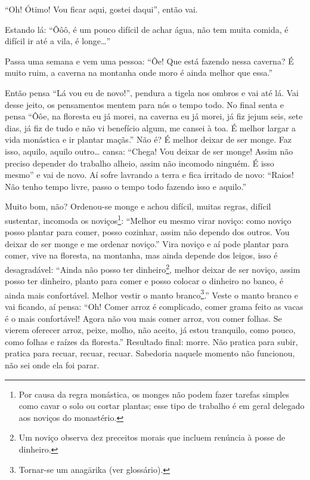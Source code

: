 “Oh! Ótimo! Vou ficar aqui, gostei daqui”, então vai. 

Estando lá: “Ôôô, é um pouco difícil de achar água, não tem muita
comida, é difícil ir até a vila, é longe…”

Passa uma semana e vem uma pessoa: “Ôe! Que está fazendo nessa
caverna? É muito ruim, a caverna na montanha onde moro é ainda melhor
que essa.”

Então pensa “Lá vou eu de novo!”, pendura a tigela nos ombros e vai
até lá. Vai desse jeito, os pensamentos mentem para nós o tempo todo.
No final senta e pensa “Ôôe, na floresta eu já morei, na caverna eu já
morei, já fiz jejum seis, sete dias, já fiz de tudo e não vi benefício
algum, me cansei à toa. É melhor largar a vida monástica e ir plantar
maçãs.” Não é? É melhor deixar de ser monge. Faz isso, aquilo, aquilo
outro… cansa: “Chega! Vou deixar de ser monge! Assim não preciso
depender do trabalho alheio, assim não incomodo ninguém. É isso mesmo”
e vai de novo. Aí sofre lavrando a terra e fica irritado de novo:
“Raios! Não tenho tempo livre, passo o tempo todo fazendo isso e
aquilo.” 

Muito bom, não? Ordenou-se monge e achou difícil, muitas regras,
difícil sustentar, incomoda os noviços\footnote{Por causa da regra
monástica, os monges não podem fazer tarefas simples como cavar o solo
ou cortar plantas; esse tipo de trabalho é em geral delegado aos
noviços do monastério.}: “Melhor eu mesmo virar noviço: como noviço
posso plantar para comer, posso cozinhar, assim não dependo dos outros.
Vou deixar de ser monge e me ordenar noviço.” Vira noviço e aí pode
plantar para comer, vive na floresta, na montanha, mas ainda depende
dos leigos, isso é desagradável: “Ainda não posso ter
dinheiro\footnote{Um noviço observa dez preceitos morais que incluem
renúncia à posse de dinheiro.}, melhor deixar de ser noviço, assim
posso ter dinheiro, planto para comer e posso colocar o dinheiro no
banco, é ainda mais confortável. Melhor vestir o manto
branco\footnote{Tornar-se um anagārika (ver glossário).}.” Veste o
manto branco e vai ficando, aí pensa: “Oh! Comer arroz é complicado,
comer grama feito as vacas é o mais confortável! Agora não vou mais
comer arroz, vou comer folhas. Se vierem oferecer arroz, peixe, molho,
não aceito, já estou tranquilo, como pouco, como folhas e raízes da
floresta.” Resultado final: morre. Não pratica para subir, pratica para
recuar, recuar, recuar. Sabedoria naquele momento não funcionou, não
sei onde ela foi parar. 

